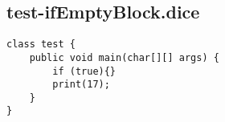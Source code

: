 \subsection{test-ifEmptyBlock.dice}
\begin{verbatim}
class test {
	public void main(char[][] args) {
  		if (true){}
  		print(17);
	}
}

\end{verbatim}
